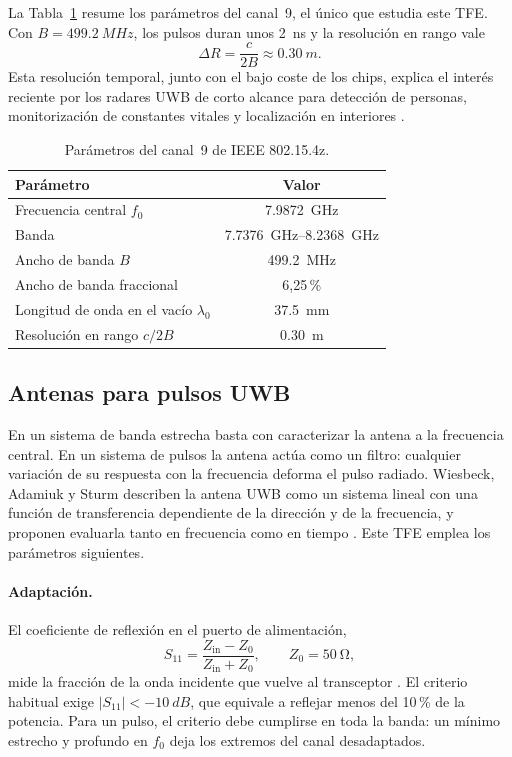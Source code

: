 \documentclass[11pt,a4paper]{article}
\begin{document}
La Tabla~\ref{tab:canal9} resume los parámetros del canal~9, el único que estudia este TFE. Con
$B = \SI{499.2}{MHz}$, los pulsos duran unos \SI{2}{ns} y la resolución en rango vale
\begin{equation}
    \Delta R = \frac{c}{2B} \approx \SI{0.30}{m}.
    \label{eq:resolucion_rango}
\end{equation}
Esta resolución temporal, junto con el bajo coste de los chips, explica el interés reciente por
los radares UWB de corto alcance para detección de personas, monitorización de constantes vitales
y localización en interiores \cite{cheraghinia2024uwbradar}.

\begin{table}[H]
    \centering
    \caption{Parámetros del canal~9 de IEEE 802.15.4z.}
    \label{tab:canal9}
    \begin{tabular}{lc}
        \toprule
        Parámetro & Valor \\
        \midrule
        Frecuencia central $f_0$ & \SI{7.9872}{GHz} \\
        Banda & \SIrange{7.7376}{8.2368}{GHz} \\
        Ancho de banda $B$ & \SI{499.2}{MHz} \\
        Ancho de banda fraccional & 6,25\,\% \\
        Longitud de onda en el vacío $\lambda_0$ & \SI{37.5}{mm} \\
        Resolución en rango $c/2B$ & \SI{0.30}{m} \\
        \bottomrule
    \end{tabular}
\end{table}

\subsection{Antenas para pulsos UWB}\label{sec:antenas_uwb}
En un sistema de banda estrecha basta con caracterizar la antena a la frecuencia central. En
un sistema de pulsos la antena actúa como un filtro: cualquier variación de su respuesta con la
frecuencia deforma el pulso radiado. Wiesbeck, Adamiuk y Sturm describen la antena UWB como un
sistema lineal con una función de transferencia dependiente de la dirección y de la frecuencia, y
proponen evaluarla tanto en frecuencia como en tiempo \cite{wiesbeck2009uwb}. Este TFE emplea
los parámetros siguientes.

\paragraph{Adaptación.} El coeficiente de reflexión en el puerto de alimentación,
\begin{equation}
    S_{11} = \frac{Z_\mathrm{in} - Z_0}{Z_\mathrm{in} + Z_0}, \qquad Z_0 = \SI{50}{\ohm},
    \label{eq:s11}
\end{equation}
mide la fracción de la onda incidente que vuelve al transceptor \cite{pozar2012microwave}. El
criterio habitual exige $|S_{11}| < \SI{-10}{dB}$, que equivale a reflejar menos del 10\,\% de la
potencia. Para un pulso, el criterio debe cumplirse en toda la banda: un mínimo estrecho y
profundo en $f_0$ deja los extremos del canal desadaptados.
\end{document}
